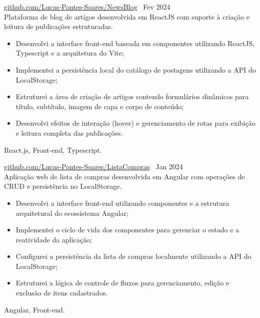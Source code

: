  \textbar{}  \href{https://github.com/Lucas-Pontes-Soares/NewsBlog}{github.com/Lucas-Pontes-Soares/NewsBlog} \hfill\ Fev 2024 \\
Plataforma de blog de artigos desenvolvida em ReactJS com suporte à criação e leitura de publicações estruturadas.
\begin{itemize}
    \item Desenvolvi a interface front-end baseada em componentes utilizando ReactJS, Typescript e a arquitetura do Vite;
    \item Implementei a persistência local do catálogo de postagens utilizando a API do LocalStorage;
    \item Estruturei a área de criação de artigos contendo formulários dinâmicos para título, subtítulo, imagem de capa e corpo de conteúdo;
    \item Desenvolvi efeitos de interação (hover) e gerenciamento de rotas para exibição e leitura completa das publicações.
\end{itemize}
 React.js, Front-end, Typescript.

        
 \textbar{}  \href{https://github.com/Lucas-Pontes-Soares/ListaCompras}{github.com/Lucas-Pontes-Soares/ListaCompras} \hfill\ Jan 2024 \\
Aplicação web de lista de compras desenvolvida em Angular com operações de CRUD e persistência no LocalStorage.
\begin{itemize}
    \item Desenvolvi a interface front-end utilizando componentes e a estrutura arquitetural do ecossistema Angular;
    \item Implementei o ciclo de vida dos componentes para gerenciar o estado e a reatividade da aplicação;
    \item Configurei a persistência da lista de compras localmente utilizando a API do LocalStorage;
    \item Estruturei a lógica de controle de fluxos para gerenciamento, edição e exclusão de itens cadastrados.
\end{itemize}
 Angular, Front-end.

        

